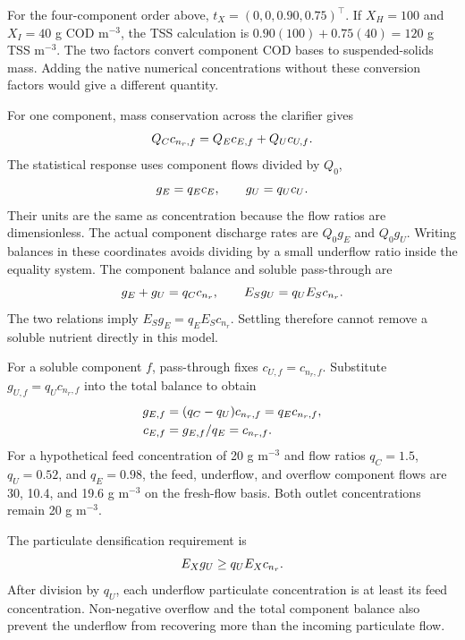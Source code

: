 For the four-component order above, $t_X=(0,0,0.90,0.75)^\top$. If $X_H=100$ and $X_I=40$ g COD m$^{-3}$, the TSS calculation is $0.90(100)+0.75(40)=120$ g TSS m$^{-3}$. The two factors convert component COD bases to suspended-solids mass. Adding the native numerical concentrations without these conversion factors would give a different quantity.

For one component, mass conservation across the clarifier gives
\begin{equation}
\equationname{Scalar mass conservation across the clarifier}
Q_Cc_{n_r,f}=Q_Ec_{E,f}+Q_Uc_{U,f}.
\end{equation}
The statistical response uses component flows divided by $Q_0$,
\begin{equation}
\equationname{Flow-weighted clarifier outlet component responses}
g_E=q_Ec_E,\qquad g_U=q_Uc_U.
\label{eq:plant_outlet_flows}
\end{equation}
Their units are the same as concentration because the flow ratios are dimensionless. The actual component discharge rates are $Q_0g_E$ and $Q_0g_U$. Writing balances in these coordinates avoids dividing by a small underflow ratio inside the equality system. The component balance and soluble pass-through are
\begin{equation}
\equationname{Joint clarifier component and soluble-transport equalities}
g_E+g_U=q_Cc_{n_r},\qquad
E_Sg_U=q_UE_Sc_{n_r}.
\label{eq:plant_clarifier_equalities}
\end{equation}
The two relations imply $E_Sg_E=q_EE_Sc_{n_r}$. Settling therefore cannot remove a soluble nutrient directly in this model.

For a soluble component $f$, pass-through fixes $c_{U,f}=c_{n_r,f}$. Substitute $g_{U,f}=q_Uc_{n_r,f}$ into the total balance to obtain
\begin{align}
\equationname{Flow-weighted soluble component in the overflow}
g_{E,f}&=(q_C-q_U)c_{n_r,f}=q_Ec_{n_r,f},\\
\equationname{Equality of overflow and feed soluble concentrations}
c_{E,f}&=g_{E,f}/q_E=c_{n_r,f}.
\end{align}
For a hypothetical feed concentration of 20 g m$^{-3}$ and flow ratios $q_C=1.5$, $q_U=0.52$, and $q_E=0.98$, the feed, underflow, and overflow component flows are 30, 10.4, and 19.6 g m$^{-3}$ on the fresh-flow basis. Both outlet concentrations remain 20 g m$^{-3}$.

The particulate densification requirement is
\begin{equation}
\equationname{Particulate densification requirement for the underflow}
E_Xg_U\ge q_UE_Xc_{n_r}.
\label{eq:plant_densification}
\end{equation}
After division by $q_U$, each underflow particulate concentration is at least its feed concentration. Non-negative overflow and the total component balance also prevent the underflow from recovering more than the incoming particulate flow.

